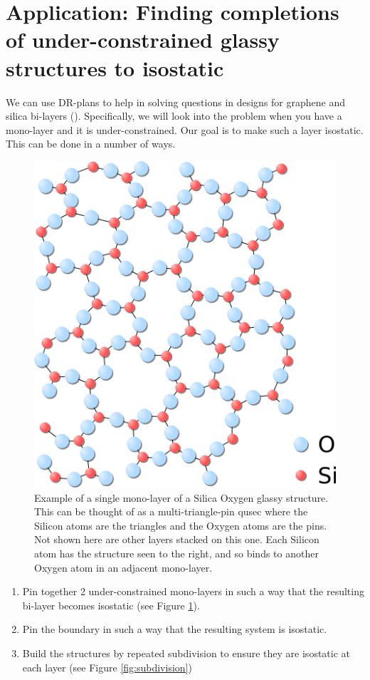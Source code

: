 \section{Application: Finding completions of under-constrained glassy structures to isostatic}
\label{sec:bodypin}

We can use DR-plans to help in solving questions in designs for graphene and silica bi-layers (). Specifically, we will look into the problem when you have a mono-layer and it is under-constrained. Our goal is to make such a layer isostatic. This can be done in a number of ways.

\begin{figure}\centering
    \includegraphics[width=0.4\linewidth]{img/Silica} \hspace{0.5cm}
    \caption{Example of a single mono-layer of a Silica Oxygen glassy structure. This can be thought of as a multi-triangle-pin qusec where the Silicon atoms are the triangles and the Oxygen atoms are the pins. Not shown here are other layers stacked on this one. Each Silicon atom has the structure seen to the right, and so binds to another Oxygen atom in an adjacent mono-layer.}
    \label{fig:silica_glass}
\end{figure}

\begin{enumerate}
    \item Pin together 2 under-constrained mono-layers in such a way that the resulting bi-layer becomes isostatic (see Figure \ref{fig:silica_glass}).
    \item Pin the boundary in such a way that the resulting system is isostatic.
    \item Build the structures by repeated subdivision to ensure they are isostatic at each layer (see Figure \ref{fig:subdivision})
\end{enumerate}

